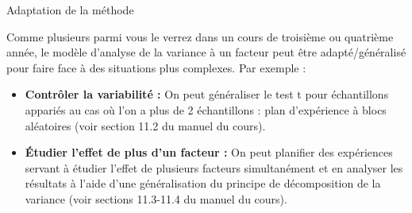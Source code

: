 \documentclass{BeamerTemplate}
\begin{document}
\begin{frame}[t]{Adaptation de la méthode}

Comme plusieurs parmi vous le verrez dans un cours de troisième ou quatrième année,
le modèle d'analyse de la variance à un facteur peut être adapté/généralisé pour faire
face à des situations plus complexes. Par exemple :
\begin{itemize}
\item<1-> {\bf Contrôler la variabilité :} On peut généraliser le test t pour échantillons appariés
au cas où l'on a plus de 2 échantillons : plan d'expérience à blocs aléatoires
(voir section 11.2 du manuel du cours).
\item<2-> {\bf Étudier l'effet de plus d'un facteur :} On peut planifier des expériences servant
à étudier l'effet de plusieurs facteurs simultanément et en analyser les résultats à l'aide
d'une généralisation du principe de décomposition de la variance
(voir sections 11.3-11.4 du manuel du cours).
\end{itemize}

\end{frame}
\end{document}
